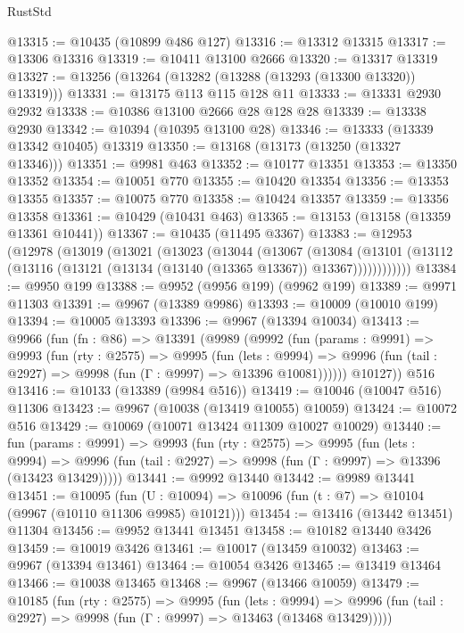 \begin{lexlean}{RustStd}
\begin{coremodule}
{\begin{coremodule}
{{{{{{{{{{{{{{{{{{{{{{{{{{{{{{{{{{{{{{{{{{{{{{{{{{{{{{{{{{{{{{{{{{{{{{{{{{{{{{@13315 := @10435 (@10899 @486 @127)
@13316 := @13312 @13315
@13317 := @13306 @13316
@13319 := @10411 @13100 @2666
@13320 := @13317 @13319
@13327 := @13256 (@13264 (@13282 (@13288 (@13293 (@13300 @13320)) @13319)))
@13331 := @13175 @113 @115 @128 @11
@13333 := @13331 @2930 @2932
@13338 := @10386 @13100 @2666 @28 @128 @28
@13339 := @13338 @2930
@13342 := @10394 (@10395 @13100 @28)
@13346 := @13333 (@13339 @13342 @10405) @13319
@13350 := @13168 (@13173 (@13250 (@13327 @13346)))
@13351 := @9981 @463
@13352 := @10177 @13351
@13353 := @13350 @13352
@13354 := @10051 @770
@13355 := @10420 @13354
@13356 := @13353 @13355
@13357 := @10075 @770
@13358 := @10424 @13357
@13359 := @13356 @13358
@13361 := @10429 (@10431 @463)
@13365 := @13153 (@13158 (@13359 @13361 @10441))
@13367 := @10435 (@11495 @3367)
@13383 := @12953
    (@12978
      (@13019
        (@13021
          (@13023
            (@13044
              (@13067
                (@13084
                  (@13101
                    (@13112 (@13116 (@13121 (@13134 (@13140 (@13365 @13367)) @13367))))))))))))
@13384 := @9950 @199
@13388 := @9952 (@9956 @199) (@9962 @199)
@13389 := @9971 @11303
@13391 := @9967 (@13389 @9986)
@13393 := @10009 (@10010 @199)
@13394 := @10005 @13393
@13396 := @9967 (@13394 @10034)
@13413 := @9966
    (fun (fn : @86) =>
    @13391
      (@9989
        (@9992
          (fun (params : @9991) =>
          @9993
            (fun (rty : @2575) =>
            @9995
              (fun (lets : @9994) =>
              @9996 (fun (tail : @2927) => @9998 (fun (Γ : @9997) => @13396 @10081))))))
        @10127))
    @516
@13416 := @10133 (@13389 (@9984 @516))
@13419 := @10046 (@10047 @516) @11306
@13423 := @9967 (@10038 (@13419 @10055) @10059)
@13424 := @10072 @516
@13429 := @10069 (@10071 @13424 @11309 @10027 @10029)
@13440 := fun (params : @9991) =>
  @9993
    (fun (rty : @2575) =>
    @9995
      (fun (lets : @9994) =>
      @9996 (fun (tail : @2927) => @9998 (fun (Γ : @9997) => @13396 (@13423 @13429)))))
@13441 := @9992 @13440
@13442 := @9989 @13441
@13451 := @10095
    (fun (U : @10094) => @10096 (fun (t : @7) => @10104 (@9967 (@10110 @11306 @9985) @10121)))
@13454 := @13416 (@13442 @13451) @11304
@13456 := @9952 @13441 @13451
@13458 := @10182 @13440 @3426
@13459 := @10019 @3426
@13461 := @10017 (@13459 @10032)
@13463 := @9967 (@13394 @13461)
@13464 := @10054 @3426
@13465 := @13419 @13464
@13466 := @10038 @13465
@13468 := @9967 (@13466 @10059)
@13479 := @10185
    (fun (rty : @2575) =>
    @9995
      (fun (lets : @9994) =>
      @9996 (fun (tail : @2927) => @9998 (fun (Γ : @9997) => @13463 (@13468 @13429)))))
}}}}}}}}}}}}}}}}}}}}}}}}}}}}}}}}}}}}}}}}}}}}}}}}}}}}}}}}}}}}}}}}}}}}}}}}}}}}}}
\end{coremodule}}
\end{coremodule}
\end{lexlean}
